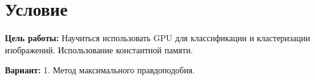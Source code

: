 \section{Условие}
\textbf{Цель работы:} Научиться использовать GPU для классификации и кластеризации изображений. Использование константной памяти.

\textbf{Вариант:} 1. Метод максимального правдоподобия.
